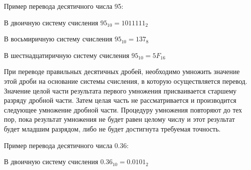 Пример перевода десятичного числа 95:

В двоичную систему счисления $95_{10}=1011111_{2}$
\begin{figure}[h]
\end{figure}

В восьмиричную систему счисления $95_{10}=137_{8}$
\begin{figure}[h]
\end{figure}

В шестнадцатиричную систему счисления $95_{10}=5F_{16}$
\begin{figure}[h]
\end{figure}

При переводе правильных десятичных дробей, необходимо умножить значение этой дроби на основание системы счисления, в которую осуществляется перевод. Значение целой части результата первого умножения присваивается старшему разряду дробной части. Затем целая часть не рассматривается и производится следующее умножение дробной части. Процедуру умножения повторяют до тех пор, пока результат умножения не будет равен целому числу и этот результат будет младшим разрядом, либо не будет достигнута требуемая точность.

Пример перевода десятичного числа 0.36:

В двоичную систему счисления $0.36_{10}=0.0101_{2}$
\begin{figure}[h]
\end{figure}


